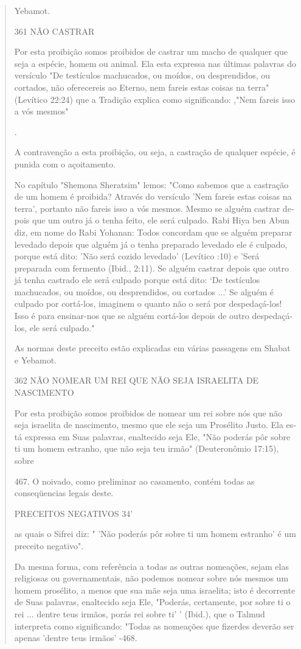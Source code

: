\begin{quote}
Yebamot.

361 NÃO CASTRAR

Por esta proibição somos proibidos de castrar um macho de qual­quer que
seja a espécie, homem ou animal. Ela esta expressa nas últimas pala­vras
do versículo "De testículos machucados, ou moídos, ou desprendidos, ou
cortados, não oferecereis ao Eterno, nem fareis estas coisas na terra"
(Levítico 22:24) que a Tradição explica como significando: ,"Nem fareis
isso a vós mesmos"

.

A contravenção a esta proibição, ou seja, a castração de qualquer
es­pécie, é punida com o açoitamento.

No capítulo "Shemona Sheratsim" lemos: "Como sabemos que a cas­tração de
um homem é proibida? Através do versículo 'Nem fareis estas coisas na
terra', portanto não fareis isso a vós mesmos. Mesmo se alguém castrar
de­pois que um outro já o tenha feito, ele será culpado. Rabi Hiya ben
Abun diz, em nome do Rabi Yohanan: Todos concordam que se alguém
preparar leveda­do depois que alguém já o tenha preparado levedado ele é
culpado, porque está dito: 'Não será cozido levedado' (Levítico :10) e
'Será preparada com fer­mento (Ibid., 2:11). Se alguém castrar depois
que outro já tenha castrado ele será culpado porque está dito: `De
testículos machucados, ou moídos, ou des­prendidos, ou cortados ...' Se
alguém é culpado por cortá-los, imaginem o quanto não o será por
despedaçá-los! Isso é para ensinar-nos que se alguém cortá-los depois de
outro despedaçá-los, ele será culpado."

As normas deste preceito estão explicadas em várias passagens em Shabat
e Yebamot.

362 NÃO NOMEAR UM REI QUE NÃO SEJA ISRAELITA DE NASCIMENTO

Por esta proibição somos proibidos de nomear um rei sobre nós que não
seja israelita de nascimento, mesmo que ele seja um Prosélito Justo. Ela
es­tá expressa em Suas palavras, enaltecido seja Ele, "Não poderás pôr
sobre ti um homem estranho, que não seja teu irmão" (Deuteronômio
17:15), sobre

467. O noivado, como preliminar ao casamento, contém todas as
conseqüencias legais deste.

PRECEITOS NEGATIVOS 34'

as quais o Sifrei diz: " 'Não poderás pôr sobre ti um homem estranho' é
um preceito negativo".

Da mesma forma, com referência a todas as outras nomeações, se­jam elas
religiosas ou governamentais, não podemos nomear sobre nós mes­mos um
homem prosélito, a menos que sua mãe seja uma israelita; isto é
decor­rente de Suas palavras, enaltecido seja Ele, "Poderás, certamente,
por sobre ti o rei ... dentre teus irmãos, porás rei sobre ti' '
(Ibid.), que o Talmud interpreta como significando: "Todas as nomeações
que fizerdes deverão ser apenas 'dentre teus irmãos' -468.


\end{quote}
